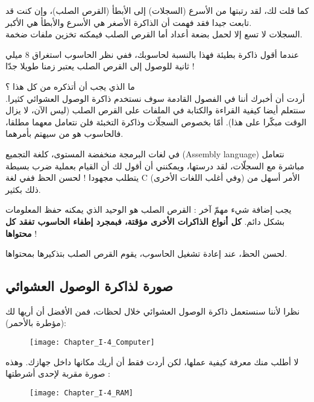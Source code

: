 كما قلت لك، لقد رتبتها من الأسرع (السجلات) إلى الأبطأ (القرص الصلب)، وإن كنت قد تابعت جيدا فقد فهمت أن الذاكرة الأصغر هي الأسرع والأبطأ هي الأكبر.\\
السجلات لا تسع إلا لحمل بضعة أعداد أما القرص الصلب فيمكنه تخزين ملفات ضخمة.

\begin{information}
   عندما أقول ذاكرة بطيئة فهذا بالنسبة لحاسوبك، ففي نظر الحاسوب استغراق 8 ميلي ثانية للوصول إلى القرص الصلب يعتبر زمنا طويلا جدّا !
\end{information}

ما الذي يجب أن أتذكره من كل هذا ؟\\
أردت أن أخبرك أننا في الفصول القادمة سوف نستخدم ذاكرة الوصول العشوائي كثيرا. سنتعلم أيضا كيفية القراءة والكتابة في الملفات على القرص الصلب (ليس الآن، لا يزال الوقت مبكّرا على هذا). أمّا بخصوص السجلّات وذاكرة التخبئة فلن نتعامل معهما مطلقا، فالحاسوب هو من سيهتم بأمرهما.

\begin{information}
  في لغات البرمجة منخفضة المستوى، كلغة التجميع
(\textenglish{Assembly language})
نتعامل مباشرة مع السجلّات، لقد درستها، ويمكنني أن أقول لك أن القيام بعملية ضرب بسيطة يتطلب مجهودا ! لحسن الحظ ففي لغة
\textenglish{C}
 (وفي أغلب اللغات الأخرى) الأمر أسهل من ذلك بكثير.
\end{information}

يجب إضافة شيء مهمّ آخر : القرص الصلب هو الوحيد الذي يمكنه حفظ المعلومات بشكل دائم.
\textbf{كل أنواع الذاكرات الأخرى مؤقتة، فبمجرد إطفاء الحاسوب تفقد كل محتواها} !

لحسن الحظ، عند إعادة تشغيل الحاسوب، يقوم القرص الصلب بتذكيرها بمحتواها.

\subsection{صورة لذاكرة الوصول العشوائي}

نظرا لأننا سنستعمل ذاكرة الوصول العشوائي خلال لحظات، فمن الأفضل أن أريها لك (مؤطرة بالأحمر):

\begin{figure}[H]
	\centering
	\texttt{[image: Chapter\_I-4\_Computer]}
\end{figure}

لا أطلب منك معرفة كيفية عملها، لكن أردت فقط أن أريك مكانها داخل جهازك. وهذه صورة مقربة لإحدى أشرطتها :

\begin{figure}[H]
	\centering
	\texttt{[image: Chapter\_I-4\_RAM]}
\end{figure}

